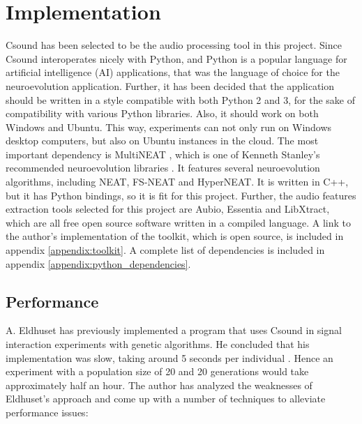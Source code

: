 \section{Implementation}
Csound has been selected to be the audio processing tool in this project. Since Csound interoperates nicely with Python, and Python is a popular language for artificial intelligence (AI) applications, that was the language of choice for the neuroevolution application. Further, it has been decided that the application should be written in a style compatible with both Python 2 and 3, for the sake of compatibility with various Python libraries. Also, it should work on both Windows and Ubuntu. This way, experiments can not only run on Windows desktop computers, but also on Ubuntu instances in the cloud. The most important dependency is MultiNEAT \citep{multineat}, which is one of Kenneth Stanley’s recommended neuroevolution libraries \citep{neatsoftware}. It features several neuroevolution algorithms, including NEAT, FS-NEAT and HyperNEAT. It is written in C++, but it has Python bindings, so it is fit for this project. Further, the audio features extraction tools selected for this project are Aubio, Essentia and LibXtract, which are all free open source software written in a compiled language. A link to the author’s implementation of the toolkit, which is open source, is included in appendix \ref{appendix:toolkit}. A complete list of dependencies is included in appendix \ref{appendix:python_dependencies}.

\subsection{Performance}
A. Eldhuset has previously implemented a program that uses Csound in signal interaction experiments with genetic algorithms. He concluded that his implementation was slow, taking around 5 seconds per individual \citep{eldhuset2015}. Hence an experiment with a population size of 20 and 20 generations would take approximately half an hour. The author has analyzed the weaknesses of Eldhuset's approach and come up with a number of techniques to alleviate performance issues:

